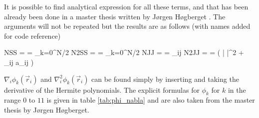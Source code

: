 It is possible to find analytical expression for all these terms, and that has been already been done in a master thesis written by Jørgen Høgberget \cite{master}. 
The arguments will not be repeated but the results are as follows 
(with names added for code reference)


\eqs
NSS =  = \sum_{k=0}^{N/2} 
\eqf
\eqs
N2SS = = \sum_{k=0}^{N/2} 
\eqf
\eqs
NJJ =  =   \sum_{i\neq j}  
\eqf
\eqs
N2JJ =  = \left ( \left |  \right |^2 + \sum_{i\neq j} a_{ij}  \right ) 
\eqf

$ \nabla_i \phi_k (\vec r_i)$ and  $ \nabla_i^2 \phi_k(\vec r_i)$ can be found simply by inserting and taking the derivative of the Hermite polynomials.
The explicit formulas for $\phi_k$ for $k$ in the range $0$ to $11$ is given in table \ref{tab:phi_nabla} and are also taken from the master thesis by Jørgen Høgberget. 

